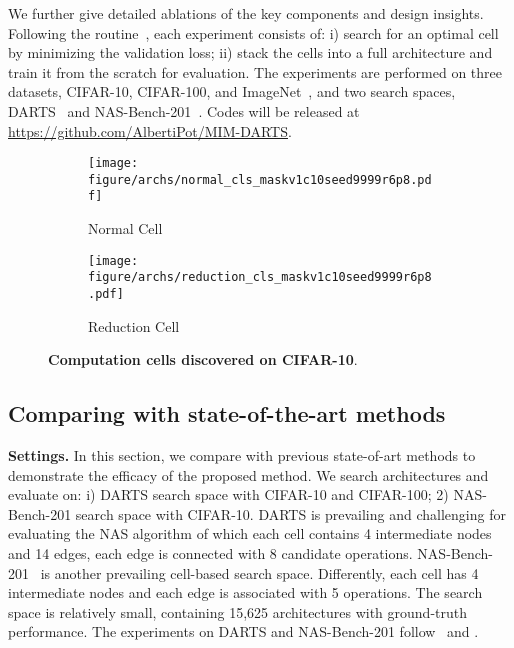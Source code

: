 \documentclass[10pt,twocolumn,letterpaper]{article}
\newcommand{\mypara}[1]{\vspace{1mm}\noindent\textbf{#1}}
\begin{document}
We further give detailed ablations of the key components and design insights.
Following the routine~\cite{liu2018darts}, each experiment consists of: 
i) search for an optimal cell by minimizing the validation loss;
ii) stack the cells into a full architecture and train it from the scratch for evaluation.
The experiments are performed on three datasets, CIFAR-10, CIFAR-100, and ImageNet~\cite{Deng_2009_ImageNet}, and two search spaces, DARTS~\cite{liu2018darts} and NAS-Bench-201~\cite{Dong2020nas201}.
Codes will be released at \url{https://github.com/AlbertiPot/MIM-DARTS}.
\begin{figure}
  \centering
  \begin{subfigure}{0.8\linewidth}
    \centering
    \texttt{[image: figure/archs/normal\_cls\_maskv1c10seed9999r6p8.pdf]}
    \vspace{-6pt}
    \caption{Normal Cell}
  \end{subfigure}

  \begin{subfigure}{0.8\linewidth}
    \centering
    \texttt{[image: figure/archs/reduction\_cls\_maskv1c10seed9999r6p8.pdf]}
    \vspace{-6pt}
    \caption{Reduction Cell}
  \end{subfigure}
  \vspace{-6pt}
  \caption{\textbf{Computation cells discovered on CIFAR-10}. 
}
  \vspace{-6pt}
  \label{fig:arch_vis_search_c10}
\end{figure} \subsection{Comparing with state-of-the-art methods}
\vspace{-4pt}
\label{sec:sota}
\mypara{Settings.}
In this section, we compare with previous state-of-art methods to demonstrate the efficacy of the proposed method.
We search architectures and evaluate on:
i) DARTS search space with CIFAR-10 and CIFAR-100;
2) NAS-Bench-201 search space with CIFAR-10.
DARTS 
is prevailing and challenging for evaluating the NAS algorithm of which each cell contains 4 intermediate nodes and 14 edges, each edge is connected with 8 candidate operations.
NAS-Bench-201~\cite{Dong2020nas201} is another prevailing cell-based search space.
Differently, each cell has 4 intermediate nodes and each edge is associated with 5 operations.
The search space is relatively small, containing 15,625 architectures with ground-truth performance.
The experiments on DARTS and NAS-Bench-201 follow~\cite{liu2018darts} and \cite{ye_2022_beta}.
\end{document}
